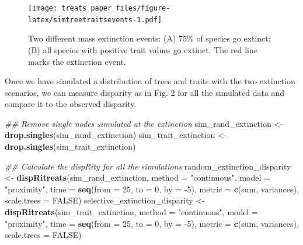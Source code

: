 \documentclass[
]{article}
\newenvironment{Shaded}{\begin{snugshade}}{\end{snugshade}}
\newcommand{\CommentTok}[1]{\textcolor[rgb]{0.56,0.35,0.01}{\textit{#1}}}
\newcommand{\DataTypeTok}[1]{\textcolor[rgb]{0.13,0.29,0.53}{#1}}
\newcommand{\DecValTok}[1]{\textcolor[rgb]{0.00,0.00,0.81}{#1}}
\newcommand{\KeywordTok}[1]{\textcolor[rgb]{0.13,0.29,0.53}{\textbf{#1}}}
\newcommand{\NormalTok}[1]{#1}
\newcommand{\OtherTok}[1]{\textcolor[rgb]{0.56,0.35,0.01}{#1}}
\newcommand{\StringTok}[1]{\textcolor[rgb]{0.31,0.60,0.02}{#1}}
\begin{document}
\begin{figure}
\centering
\texttt{[image: treats\_paper\_files/figure-latex/simtreetraitsevents-1.pdf]}
\caption{Two different mass extinction events: (A) 75\% of species go
extinct; (B) all species with positive trait values go extinct. The red
line marks the extinction event.}
\end{figure}

Once we have simulated a distribution of trees and traits with the two
extinction scenarios, we can measure disparity as in Fig. 2 for all the
simulated data and compare it to the observed disparity.

\begin{Shaded}
\begin{Highlighting}[]
\CommentTok{\#\# Remove single nodes simulated at the extinction}
\NormalTok{sim\_rand\_extinction \textless{}{-}}\StringTok{ }\KeywordTok{drop.singles}\NormalTok{(sim\_rand\_extinction)}
\NormalTok{sim\_trait\_extinction \textless{}{-}}\StringTok{ }\KeywordTok{drop.singles}\NormalTok{(sim\_trait\_extinction)}

\CommentTok{\#\# Calculate the dispRity for all the simulations}
\NormalTok{random\_extinction\_disparity \textless{}{-}}\StringTok{ }\KeywordTok{dispRitreats}\NormalTok{(sim\_rand\_extinction,}
                                            \DataTypeTok{method =} \StringTok{"continuous"}\NormalTok{,}
                                            \DataTypeTok{model  =} \StringTok{"proximity"}\NormalTok{,}
                                            \DataTypeTok{time   =} \KeywordTok{seq}\NormalTok{(}\DataTypeTok{from =} \DecValTok{25}\NormalTok{, }\DataTypeTok{to =} \DecValTok{0}\NormalTok{, }\DataTypeTok{by =} \DecValTok{{-}5}\NormalTok{),}
                                            \DataTypeTok{metric =} \KeywordTok{c}\NormalTok{(sum, variances),}
                                            \DataTypeTok{scale.trees =} \OtherTok{FALSE}\NormalTok{)}
\NormalTok{selective\_extinction\_disparity \textless{}{-}}\StringTok{ }\KeywordTok{dispRitreats}\NormalTok{(sim\_trait\_extinction,}
                                            \DataTypeTok{method =} \StringTok{"continuous"}\NormalTok{,}
                                            \DataTypeTok{model  =} \StringTok{"proximity"}\NormalTok{,}
                                            \DataTypeTok{time   =} \KeywordTok{seq}\NormalTok{(}\DataTypeTok{from =} \DecValTok{25}\NormalTok{, }\DataTypeTok{to =} \DecValTok{0}\NormalTok{, }\DataTypeTok{by =} \DecValTok{{-}5}\NormalTok{),}
                                            \DataTypeTok{metric =} \KeywordTok{c}\NormalTok{(sum, variances),}
                                            \DataTypeTok{scale.trees =} \OtherTok{FALSE}\NormalTok{)}


\end{Highlighting}
\end{Shaded}
\end{document}
